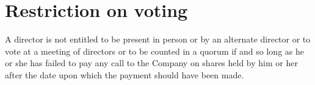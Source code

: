 \section{Restriction on voting}

A director is not entitled to be present in person or by an alternate director or to vote at a meeting of directors or to be counted in a quorum if and so long as he or she has failed to pay any call to the Company on shares held by him or her after the date upon which the payment should have been made. 